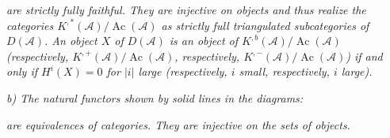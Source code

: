 \clearpage
{}%
\begingroup\small\setlength{\parskip}{0pt}\setlength{\emergencystretch}{1.5em}
\setlength{\abovedisplayskip}{4pt plus 2pt minus 2pt}%
\setlength{\belowdisplayskip}{4pt plus 2pt minus 2pt}%

\noindent\textit{are strictly fully faithful. They are injective on objects and
thus realize the categories $K^{,*}(\mathcal A)/\operatorname{Ac}(\mathcal A)$
as strictly full triangulated subcategories of $D(\mathcal A)$. An object
$X$ of $D(\mathcal A)$ is an object of
$K^{,b}(\mathcal A)/\operatorname{Ac}(\mathcal A)$ (respectively,
$K^{,+}(\mathcal A)/\operatorname{Ac}(\mathcal A)$, respectively,
$K^{,-}(\mathcal A)/\operatorname{Ac}(\mathcal A)$) if and only if
$H^i(X)=0$ for $|i|$ large (respectively, $i$ small, respectively, $i$
large).}

\noindent\textit{b) The natural functors shown by solid lines in the diagrams:}
\begin{center}

\medskip
{}
\end{center}
\noindent\textit{are equivalences of categories. They are injective on the sets
of objects.}

